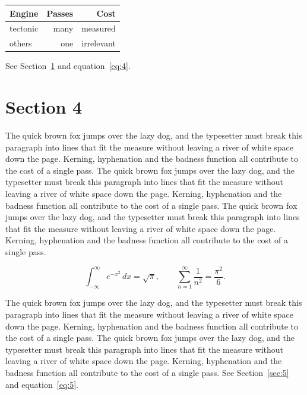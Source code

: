 \documentclass{article}
\begin{document}
\begin{center}
\begin{tabular}{lrr}
\toprule
Engine & Passes & Cost \\
\midrule
tectonic & many & measured \\
others & one & irrelevant \\
\bottomrule
\end{tabular}
\end{center}

See Section~\ref{sec:4} and equation~\eqref{eq:4}.
\section{Section 4}
\label{sec:4}
The quick brown fox jumps over the lazy dog, and the typesetter must break this paragraph into lines that fit the measure without leaving a river of white space down the page. Kerning, hyphenation and the badness function all contribute to the cost of a single pass. The quick brown fox jumps over the lazy dog, and the typesetter must break this paragraph into lines that fit the measure without leaving a river of white space down the page. Kerning, hyphenation and the badness function all contribute to the cost of a single pass. The quick brown fox jumps over the lazy dog, and the typesetter must break this paragraph into lines that fit the measure without leaving a river of white space down the page. Kerning, hyphenation and the badness function all contribute to the cost of a single pass. 

\begin{equation}\label{eq:4}
\int_{-\infty}^{\infty} e^{-x^{2}}\,dx = \sqrt{\pi}, \qquad
\sum_{n=1}^{\infty} \frac{1}{n^{2}} = \frac{\pi^{2}}{6}.
\end{equation}

The quick brown fox jumps over the lazy dog, and the typesetter must break this paragraph into lines that fit the measure without leaving a river of white space down the page. Kerning, hyphenation and the badness function all contribute to the cost of a single pass. The quick brown fox jumps over the lazy dog, and the typesetter must break this paragraph into lines that fit the measure without leaving a river of white space down the page. Kerning, hyphenation and the badness function all contribute to the cost of a single pass. 
See Section~\ref{sec:5} and equation~\eqref{eq:5}.
\end{document}
